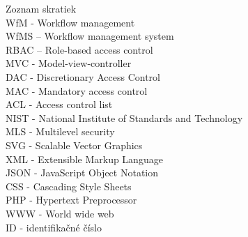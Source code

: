\documentclass[12pt, oneside]{book}
\begin{document}

\newpage 


\tableofcontents





\newpage 
{\LARGE Zoznam skratiek}\\

\noindent
WfM - Workflow management\\
WfMS – Workflow management system\\
RBAC – Role-based access control\\
MVC - Model-view-controller\\
DAC - Discretionary Access Control\\
MAC - Mandatory access control\\
ACL - Access control list\\
NIST - National Institute of Standards and Technology\\
MLS - Multilevel security\\
SVG - Scalable Vector Graphics\\
XML - Extensible Markup Language\\
JSON - JavaScript Object Notation\\
CSS - Cascading Style Sheets\\
PHP - Hypertext Preprocessor\\
WWW - World wide web \\
ID - identifikačné číslo\\ 
\clearpage
{}
\listoffigures
\begingroup
\let\clearpage\relax
\listoftables
\endgroup





\mainmatter
\pagestyle{plain}

 











\newpage

\backmatter

\thispagestyle{empty}
\nocite{*}
\clearpage
\end{document}
